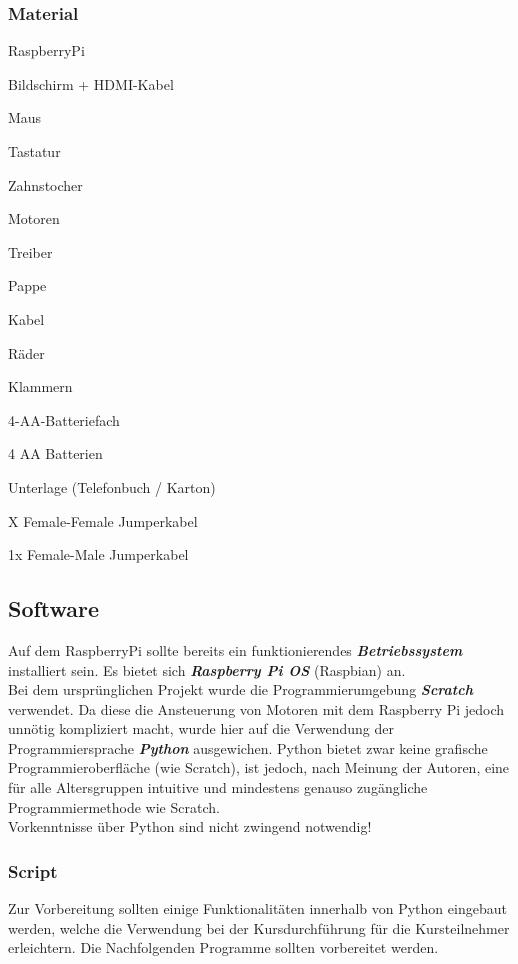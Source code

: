 \documentclass[12pt]{article}
\let\oldemph\emph
\renewcommand{\emph}[1]{\textbf{\oldemph{#1}}}
\begin{document}
\subsubsection{Material}
\begin{checklist}
    \item RaspberryPi
    \item Bildschirm + HDMI-Kabel
    \item Maus
    \item Tastatur
    \item Zahnstocher
    \item Motoren
    \item Treiber
    \item Pappe
    \item Kabel
    \item Räder
    \item Klammern
    \item 4-AA-Batteriefach
    \item 4 AA Batterien
    \item Unterlage (Telefonbuch / Karton)
    \item X Female-Female Jumperkabel
    \item 1x Female-Male Jumperkabel
\end{checklist}


\subsection{Software}
Auf dem RaspberryPi sollte bereits ein funktionierendes \emph{Betriebssystem} installiert sein. Es bietet sich \emph{Raspberry Pi OS} (Raspbian) an. \\

Bei dem ursprünglichen Projekt wurde die Programmierumgebung \emph{Scratch} verwendet. Da diese die Ansteuerung von Motoren mit dem Raspberry Pi jedoch unnötig kompliziert macht, wurde hier auf die Verwendung der Programmiersprache \emph{Python} ausgewichen. Python bietet zwar keine grafische Programmieroberfläche (wie Scratch), ist jedoch, nach Meinung der Autoren, eine für alle Altersgruppen intuitive und mindestens genauso zugängliche Programmiermethode wie Scratch.\\

Vorkenntnisse über Python sind nicht zwingend notwendig!

\subsubsection{Script}
Zur Vorbereitung sollten einige Funktionalitäten innerhalb von Python eingebaut werden, welche die Verwendung bei der Kursdurchführung für die Kursteilnehmer erleichtern. Die Nachfolgenden Programme sollten vorbereitet werden.\\
\end{document}
